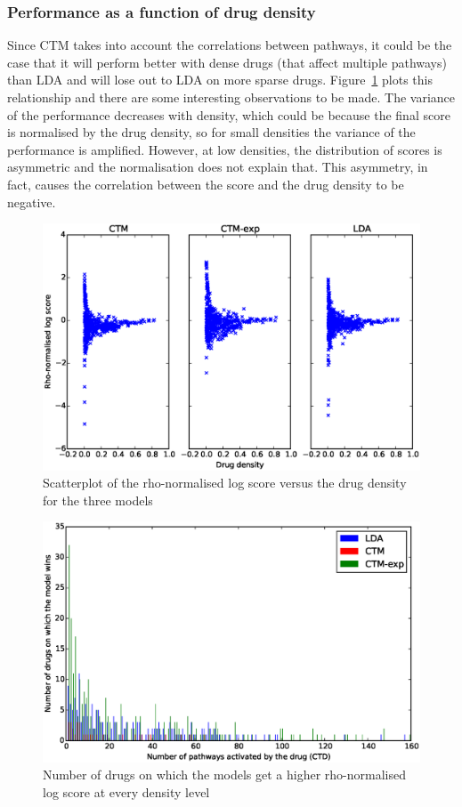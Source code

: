 \documentclass[12pt,a4paper,twoside,openright]{report}
\begin{document}
\subsubsection{Performance as a function of drug density}

Since CTM takes into account the correlations between pathways, it could be the case that it will perform better with dense drugs (that affect multiple pathways) than LDA and will lose out to LDA on more sparse drugs. Figure~\ref{fig:ctd-ctm-lda-scatter} plots this relationship and there are some interesting observations to be made. The variance of the performance decreases with density, which could be because the final score is normalised by the drug density, so for small densities the variance of the performance is amplified. However, at low densities, the distribution of scores is asymmetric and the normalisation does not explain that. This asymmetry, in fact, causes the correlation between the score and the drug density to be negative.

\begin{figure}[!htb]
\includegraphics[width=\textwidth]{ctd-ctm-lda-scatter.eps}
\caption{Scatterplot of the rho-normalised log score versus the drug density for the three models}
\label{fig:ctd-ctm-lda-scatter}
\end{figure}

\begin{figure}[!htb]
\includegraphics[width=\textwidth]{ctd-ctm-lda-ctmexp-bar.eps}
\caption{Number of drugs on which the models get a higher rho-normalised log score at every density level}
\label{fig:ctd-ctm-lda-bar}
\end{figure}
\end{document}
